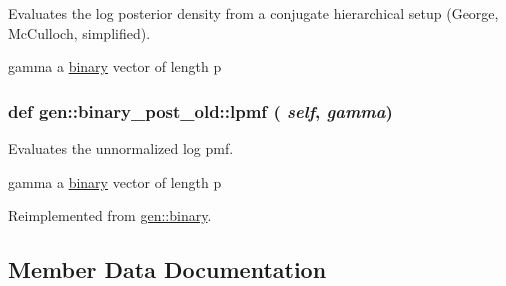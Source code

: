 Evaluates the log posterior density from a conjugate hierarchical setup (George, McCulloch, simplified). 

gamma a \hyperlink{classgen_1_1binary}{binary} vector of length p \hypertarget{classgen_1_1binary__post__old_4a2b39c9d4d59a01f64f0f593f5034c3}{
\subsubsection[{lpmf}]{\setlength{\rightskip}{0pt plus 5cm}def gen::binary\_\-post\_\-old::lpmf ( {\em self}, \/   {\em gamma})}}
\label{classgen_1_1binary__post__old_4a2b39c9d4d59a01f64f0f593f5034c3}


Evaluates the unnormalized log pmf. 

gamma a \hyperlink{classgen_1_1binary}{binary} vector of length p 

Reimplemented from \hyperlink{classgen_1_1binary_0377b3ffdd44806d72453d0b8ead1758}{gen::binary}.

\subsection{Member Data Documentation}
\hypertarget{classgen_1_1binary__post__old_7adec8797994071a78edc8c5727336d3}{
\subsubsection[{c1}]{}}
\label{classgen_1_1binary__post__old_7adec8797994071a78edc8c5727336d3}


\hypertarget{classgen_1_1binary__post__old_10f35d33de2a393287d487c7a4362154}{
\subsubsection[{c2}]{}}
\label{classgen_1_1binary__post__old_10f35d33de2a393287d487c7a4362154}


\hypertarget{classgen_1_1binary__post__old_1cb800e469204fec167fc5429a228a2d}{
\subsubsection[{c3}]{}}
\label{classgen_1_1binary__post__old_1cb800e469204fec167fc5429a228a2d}


